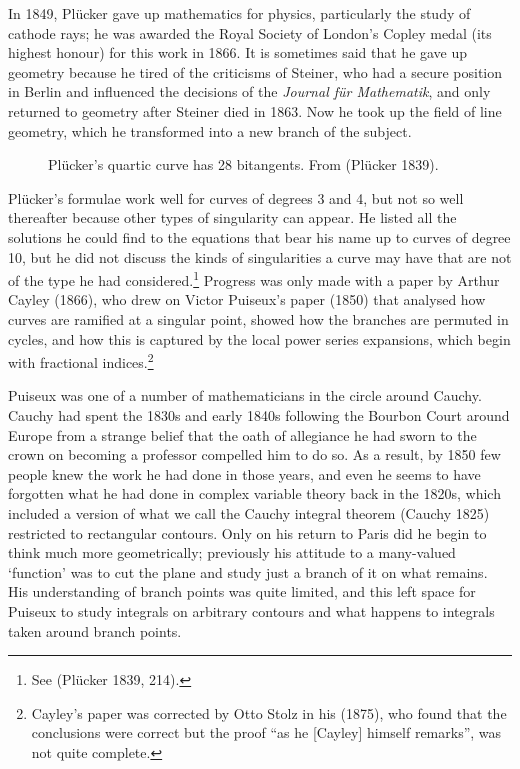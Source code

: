 In 1849, Pl\"ucker gave up mathematics for physics, particularly the study of cathode rays; he was awarded the Royal Society of London's Copley medal (its highest honour) for this work in 1866. It is sometimes said that he gave up geometry because he tired of the criticisms of Steiner, who had a secure position in Berlin and influenced the decisions of the \emph{Journal f\"ur Mathematik}, and only returned to geometry after Steiner died in 1863. Now he took up  the field of line geometry, which he transformed into a new branch of the subject. 

\begin{figure}
\caption{Pl\"ucker's quartic curve has 28 bitangents. From (Pl\"ucker 1839).}
      \label{fig28bitangents}
\end{figure}

Pl\"ucker's formulae work well for curves of degrees 3 and 4,  but not so well thereafter because other types of singularity can appear.   He listed all the solutions he could find to the equations that bear his name up to curves of degree 10, but he did not discuss the kinds of singularities a curve may have that are not of the type he had considered.\footnote{See (Pl\"ucker 1839, 214).}  Progress was only made with a paper by Arthur Cayley (1866), who drew on Victor Puiseux's paper (1850) that analysed  how curves are ramified at a singular point,  showed how the branches are permuted in cycles, and how this is captured by the local power series expansions, which begin with fractional indices.\footnote{Cayley's paper was corrected by Otto Stolz in his (1875), who found that the conclusions were correct but the proof ``as he [Cayley] himself remarks'', was not quite complete.}

Puiseux was one of a number of mathematicians in the circle around Cau\-chy. Cauchy had spent the 1830s and early 1840s following the Bourbon Court around Europe from a strange belief that the oath of allegiance he had sworn to the crown on becoming a professor compelled him to do so. As a result, by 1850 few people knew the work he had done in those years, and even he seems to have forgotten what he had done in complex variable theory back in the 1820s, which included a version of what we call the Cauchy integral theorem (Cauchy 1825) restricted to rectangular contours. Only on his return to Paris did he begin to think much more geometrically; previously his attitude to a many-valued `function' was to cut the plane and study just a branch of it on what remains. His understanding of branch points was quite limited, and this left space for Puiseux to study integrals on arbitrary contours   and what happens to integrals taken around branch points. 


